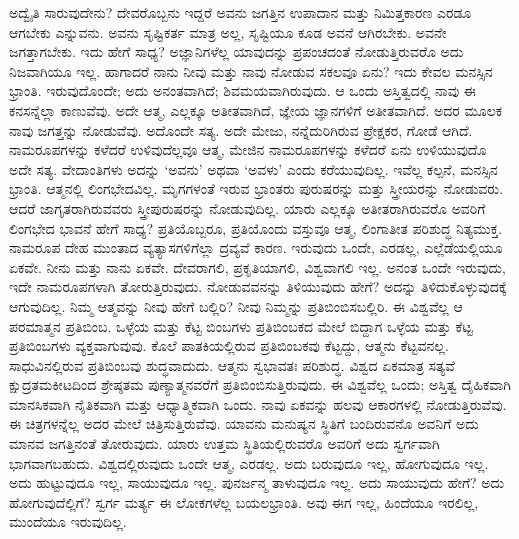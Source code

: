 ಅದ್ವೈತಿ ಸಾರುವುದೇನು? ದೇವರೊಬ್ಬನು ಇದ್ದರೆ ಅವನು ಜಗತ್ತಿನ ಉಪಾದಾನ ಮತ್ತು ನಿಮಿತ್ತಕಾರಣ ಎರಡೂ ಆಗಬೇಕು ಎನ್ನುವನು. ಅವನು ಸೃಷ್ಟಿಕರ್ತ ಮಾತ್ರ ಅಲ್ಲ, ಸೃಷ್ಟಿಯೂ ಕೂಡ ಅವನೆ ಆಗಿರಬೇಕು. ಅವನೇ ಜಗತ್ತಾಗಬೇಕು. ಇದು ಹೇಗೆ ಸಾಧ್ಯ? ಅಜ್ಞಾನಿಗಳೆಲ್ಲ ಯಾವುದನ್ನು ಪ್ರಪಂಚದಂತೆ ನೋಡುತ್ತಿರುವರೊ ಅದು ನಿಜವಾಗಿಯೂ ಇಲ್ಲ. ಹಾಗಾದರೆ ನಾನು ನೀವು ಮತ್ತು ನಾವು ನೋಡುವ ಸಕಲವೂ ಏನು? ಇದು ಕೇವಲ ಮನಸ್ಸಿನ ಭ್ರಾಂತಿ. ಇರುವುದೊಂದೇ; ಅದು ಅನಂತವಾಗಿದೆ; ಶಿವಮಯವಾಗಿರುವುದು. ಆ ಒಂದು ಅಸ್ತಿತ್ವದಲ್ಲಿ ನಾವು ಈ ಕನಸನ್ನೆಲ್ಲಾ ಕಾಣುವೆವು. ಅದೇ ಆತ್ಮ, ಎಲ್ಲಕ್ಕೂ ಅತೀತವಾಗಿದೆ, ಜ್ಞೇಯ ಜ್ಞಾನಗಳಿಗೆ ಅತೀತವಾಗಿದೆ. ಅದರ ಮೂಲಕ ನಾವು ಜಗತ್ತನ್ನು ನೋಡುವೆವು. ಅದೊಂದೇ ಸತ್ಯ. ಅದೇ ಮೇಜು, ನನ್ನೆದುರಿಗಿರುವ ಪ್ರೇಕ್ಷಕರ, ಗೋಡೆ ಆಗಿದೆ. ನಾಮರೂಪಗಳನ್ನು ಕಳೆದರೆ ಉಳಿವುದೆಲ್ಲವೂ ಆತ್ಮ, ಮೇಜಿನ ನಾಮರೂಪಗಳನ್ನು ಕಳೆದರೆ ಏನು ಉಳಿಯುವುದೊ ಅದೇ ಸತ್ಯ. ವೇದಾಂತಿಗಳು ಅದನ್ನು ‘ಅವನು’ ಅಥವಾ ‘ಅವಳು’ ಎಂದು ಕರೆಯುವುದಿಲ್ಲ. ಇವೆಲ್ಲ ಕಲ್ಪನೆ, ಮನಸ್ಸಿನ ಭ್ರಾಂತಿ. ಆತ್ಮನಲ್ಲಿ ಲಿಂಗಭೇದವಿಲ್ಲ. ಮೃಗಗಳಂತೆ ಇರುವ ಭ್ರಾಂತರು ಪುರುಷರನ್ನು ಮತ್ತು ಸ್ತ್ರೀಯರನ್ನು ನೋಡುವರು. ಆದರೆ ಜಾಗೃತರಾಗಿರುವವರು ಸ್ತ್ರೀಪುರುಷರನ್ನು ನೋಡುವುದಿಲ್ಲ. ಯಾರು ಎಲ್ಲಕ್ಕೂ ಅತೀತರಾಗಿರುವರೊ ಅವರಿಗೆ ಲಿಂಗಭೇದ ಭಾವನೆ ಹೇಗೆ ಸಾಧ್ಯ? ಪ್ರತಿಯೊಬ್ಬರೂ, ಪ್ರತಿಯೊಂದು ವಸ್ತುವೂ ಆತ್ಮ, ಲಿಂಗಾತೀತ ಪರಿಶುದ್ಧ ನಿತ್ಯಮುಕ್ತ. ನಾಮರೂಪ ದೇಹ ಮುಂತಾದ ವ್ಯತ್ಯಾಸಗಳಿಗೆಲ್ಲಾ ದ್ರವ್ಯವೆ ಕಾರಣ. ಇರುವುದು ಒಂದೇ, ಎರಡಲ್ಲ, ಎಲ್ಲೆಡೆಯಲ್ಲಿಯೂ ಏಕವೇ. ನೀನು ಮತ್ತು ನಾನು ಏಕವೇ. ದೇವರಾಗಲಿ, ಪ್ರಕೃತಿಯಾಗಲಿ, ವಿಶ್ವವಾಗಲಿ ಇಲ್ಲ. ಅನಂತ ಒಂದೇ ಇರುವುದು, ಇದೇ ನಾಮರೂಪಗಳಾಗಿ ತೋರುತ್ತಿರುವುದು. ನೋಡುವವನನ್ನು ತಿಳಿಯುವುದು ಹೇಗೆ? ಅದನ್ನು ತಿಳಿದುಕೊಳ್ಳುವುದಕ್ಕೆ ಆಗುವುದಿಲ್ಲ. ನಿಮ್ಮ ಆತ್ಮವನ್ನು ನೀವು ಹೇಗೆ ಬಲ್ಲಿರಿ? ನೀವು ನಿಮ್ಮನ್ನು ಪ್ರತಿಬಿಂಬಿಸಬಲ್ಲಿರಿ. ಈ ವಿಶ್ವವೆಲ್ಲ ಆ ಪರಮಾತ್ಮನ ಪ್ರತಿಬಿಂಬ. ಒಳ್ಳೆಯ ಮತ್ತು ಕೆಟ್ಟ ಬಿಂಬಗಳು ಪ್ರತಿಬಿಂಬಕದ ಮೇಲೆ ಬಿದ್ದಾಗ ಒಳ್ಳೆಯ ಮತ್ತು ಕೆಟ್ಟ ಪ್ರತಿಬಿಂಬಗಳು ವ್ಯಕ್ತವಾಗುವುವು. ಕೊಲೆ ಪಾತಕಿಯಲ್ಲಿರುವ ಪ್ರತಿಬಿಂಬಕವು ಕೆಟ್ಟದ್ದು, ಆತ್ಮನು ಕೆಟ್ಟವನಲ್ಲ. ಸಾಧುವಿನಲ್ಲಿರುವ ಪ್ರತಿಬಿಂಬವು ಶುದ್ಧವಾದುದು. ಆತ್ಮನು ಸ್ವಭಾವತಃ ಪರಿಶುದ್ಧ. ವಿಶ್ವದ ಏಕಮಾತ್ರ ಸತ್ಯವೆ ಕ್ಷುದ್ರತಮಕೀಟದಿಂದ ಶ್ರೇಷ್ಠತಮ ಪುಣ್ಯಾತ್ಮನವರೆಗೆ ಪ್ರತಿಬಿಂಬಿಸುತ್ತಿರುವುದು. ಈ ವಿಶ್ವವೆಲ್ಲ ಒಂದು; ಅಸ್ತಿತ್ವ ದೈಹಿಕವಾಗಿ ಮಾನಸಿಕವಾಗಿ ನೈತಿಕವಾಗಿ ಮತ್ತು ಆಧ್ಯಾತ್ಮಿಕವಾಗಿ ಒಂದು. ನಾವು ಏಕವನ್ನು ಹಲವು ಆಕಾರಗಳಲ್ಲಿ ನೋಡುತ್ತಿರುವೆವು. ಈ ಚಿತ್ರಗಳನ್ನೆಲ್ಲ ಅದರ ಮೇಲೆ ಚಿತ್ರಿಸುತ್ತಿರುವೆವು. ಯಾವನು ಮನುಷ್ಯನ ಸ್ಥಿತಿಗೆ ಬಂದಿರುವನೊ ಅವನಿಗೆ ಅದು ಮಾನವ ಜಗತ್ತಿನಂತೆ ತೋರುವುದು. ಯಾರು ಉತ್ತಮ ಸ್ಥಿತಿಯಲ್ಲಿರುವರೊ ಅವರಿಗೆ ಅದು ಸ್ವರ್ಗವಾಗಿ ಭಾಗವಾಗಬಹುದು. ವಿಶ್ವದಲ್ಲಿರುವುದು ಒಂದೇ ಆತ್ಮ, ಎರಡಲ್ಲ. ಅದು ಬರುವುದೂ ಇಲ್ಲ, ಹೋಗುವುದೂ ಇಲ್ಲ. ಅದು ಹುಟ್ಟುವುದೂ ಇಲ್ಲ, ಸಾಯುವುದೂ ಇಲ್ಲ. ಪುನರ್ಜನ್ಮ ತಾಳುವುದೂ ಇಲ್ಲ. ಅದು ಸಾಯುವುದು ಹೇಗೆ? ಅದು ಹೋಗುವುದೆಲ್ಲಿಗೆ? ಸ್ವರ್ಗ ಮರ್ತ್ಯ ಈ ಲೋಕಗಳೆಲ್ಲ ಬಯಲಭ್ರಾಂತಿ. ಅವು ಈಗ ಇಲ್ಲ, ಹಿಂದೆಯೂ ಇರಲಿಲ್ಲ, ಮುಂದೆಯೂ ಇರುವುದಿಲ್ಲ.

